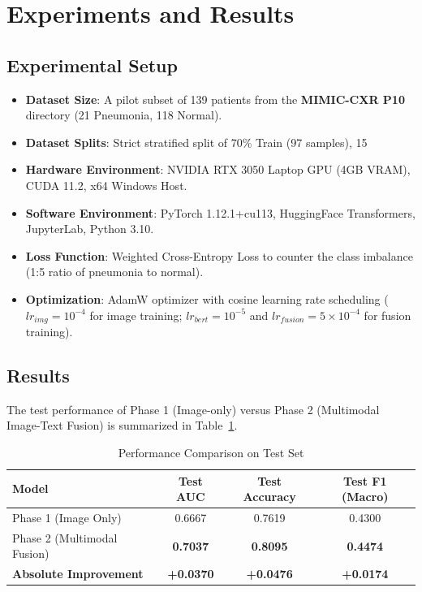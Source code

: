 \documentclass[11pt,a4paper]{article}
\begin{document}
\section{Experiments and Results} \label{sec:experiments}

\subsection{Experimental Setup}
\begin{itemize}
    \item \textbf{Dataset Size}: A pilot subset of 139 patients from the \textbf{MIMIC-CXR P10} directory (21 Pneumonia, 118 Normal).
    \item \textbf{Dataset Splits}: Strict stratified split of 70\% Train (97 samples), 15%
    \item \textbf{Hardware Environment}: NVIDIA RTX 3050 Laptop GPU (4GB VRAM), CUDA 11.2, x64 Windows Host.
    \item \textbf{Software Environment}: PyTorch 1.12.1+cu113, HuggingFace Transformers, JupyterLab, Python 3.10.
    \item \textbf{Loss Function}: Weighted Cross-Entropy Loss to counter the class imbalance (1:5 ratio of pneumonia to normal).
    \item \textbf{Optimization}: AdamW optimizer with cosine learning rate scheduling ($lr_{img} = 10^{-4}$ for image training; $lr_{bert} = 10^{-5}$ and $lr_{fusion} = 5 \times 10^{-4}$ for fusion training).
\end{itemize}

\subsection{Results}
The test performance of Phase 1 (Image-only) versus Phase 2 (Multimodal Image-Text Fusion) is summarized in Table~\ref{tab:results}.

\begin{table}[h]
\centering
\caption{Performance Comparison on Test Set}
\label{tab:results}
\begin{tabular}{lccc}
\toprule
\textbf{Model} & \textbf{Test AUC} & \textbf{Test Accuracy} & \textbf{Test F1 (Macro)} \\
\midrule
Phase 1 (Image Only) & 0.6667 & 0.7619 & 0.4300 \\
Phase 2 (Multimodal Fusion) & \textbf{0.7037} & \textbf{0.8095} & \textbf{0.4474} \\
\midrule
\textbf{Absolute Improvement} & \textbf{+0.0370} & \textbf{+0.0476} & \textbf{+0.0174} \\
\bottomrule
\end{tabular}
\end{table}
\end{document}
